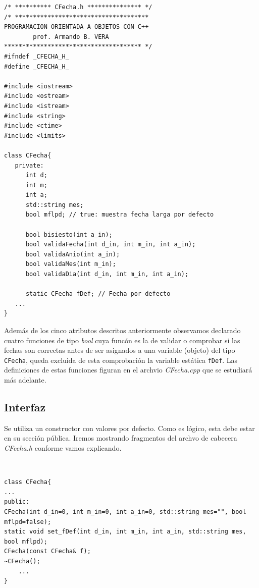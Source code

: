 \documentclass[10pt,a4paper]{article}
\begin{document}
\color{orange}
\begin{verbatim}
/* ********** CFecha.h *************** */
/* *************************************
PROGRAMACION ORIENTADA A OBJETOS CON C++
		prof. Armando B. VERA
************************************** */
#ifndef _CFECHA_H_
#define _CFECHA_H_

#include <iostream>
#include <ostream>
#include <istream>
#include <string>
#include <ctime>
#include <limits>

class CFecha{
   private:
      int d;
      int m;
      int a;
      std::string mes;
      bool mflpd; // true: muestra fecha larga por defecto	

      bool bisiesto(int a_in);
      bool validaFecha(int d_in, int m_in, int a_in);
      bool validaAnio(int a_in);
      bool validaMes(int m_in);
      bool validaDia(int d_in, int m_in, int a_in);
	
      static CFecha fDef; // Fecha por defecto
   ...
}	
\end{verbatim}
\color{black}

Adem\'as de los cinco atributos descritos anteriormente observamos declarado cuatro funciones de tipo \textit{bool} cuya func\'on es la de validar o comprobar si las fechas son correctas antes de ser asignados a una variable (objeto) del tipo \texttt{CFecha}, queda excluida de esta comprobaci\'on la variable est\'atica \texttt{fDef}. Las definiciones de estas funciones figuran en el archvio \textit{CFecha.cpp} que se estudiar\'a m\'as adelante.

\subsection*{Interfaz}

Se utiliza un constructor con valores por defecto. Como es l\'ogico, esta debe estar en su secci\'on p\'ublica. Iremos mostrando fragmentos del archvo de cabecera \textit{CFecha.h} conforme vamos explicando.

\color{orange}
\begin{verbatim}
\end{verbatim}
\color{black}


\color{orange}
\begin{verbatim}

class CFecha{
...
public:
CFecha(int d_in=0, int m_in=0, int a_in=0, std::string mes="", bool mflpd=false);
static void set_fDef(int d_in, int m_in, int a_in, std::string mes, bool mflpd); 
CFecha(const CFecha& f);
~CFecha();
	...
}
\end{verbatim}
\color{black}
\end{document}
